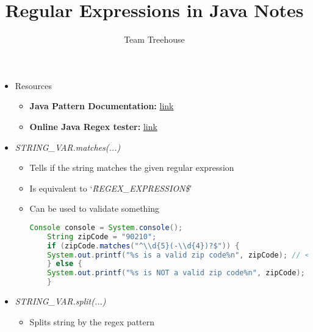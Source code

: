 \documentclass[12pt]{article}
\begin{document}
\title{Regular Expressions in Java Notes}
\author{Team Treehouse}
\maketitle

\begin{itemize}
    \item Resources
    \begin{itemize}
        \item \textbf{Java Pattern Documentation:} \href{https://docs.oracle.com/javase/8/docs/api/java/util/regex/Pattern.html}{link}
        \item \textbf{Online Java Regex tester:} \href{https://www.freeformatter.com/java-regex-tester.html}{link}
    \end{itemize}
    \item \textit{STRING\_VAR.matches(...)}
    \begin{itemize}
        \item Tells if the string matches the given regular expression
        \item Is equivalent to `\textit{\^REGEX\_EXPRESSION\$}'
        \item Can be used to validate something

    \begin{lstlisting}[language=Java, caption={demo/Explore1.java}]
    Console console = System.console();
    String zipCode = "90210";
    if (zipCode.matches("^\\d{5}(-\\d{4})?$")) {
    System.out.printf("%s is a valid zip code%n", zipCode); // <- returns 90210 is a valid zip code
    } else {
    System.out.printf("%s is NOT a valid zip code%n", zipCode);
    }
    \end{lstlisting}

    \end{itemize}

    \item \textit{STRING\_VAR.split(...)}
    \begin{itemize}
        \item Splits string by the regex pattern

    \begin{lstlisting}[language=Java, caption={demo/Explore2.java}]
    \end{lstlisting}

    \end{itemize}

\end{itemize}
\end{document}
